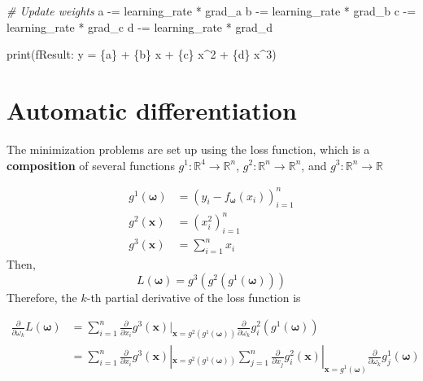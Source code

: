 \documentclass[
]{article}
\newenvironment{Shaded}{}{}
\newcommand{\BuiltInTok}[1]{\textcolor[rgb]{0.00,0.50,0.00}{#1}}
\newcommand{\CommentTok}[1]{\textcolor[rgb]{0.38,0.63,0.69}{\textit{#1}}}
\newcommand{\NormalTok}[1]{#1}
\newcommand{\OperatorTok}[1]{\textcolor[rgb]{0.40,0.40,0.40}{#1}}
\newcommand{\SpecialCharTok}[1]{\textcolor[rgb]{0.25,0.44,0.63}{#1}}
\newcommand{\SpecialStringTok}[1]{\textcolor[rgb]{0.73,0.40,0.53}{#1}}
\begin{document}
\begin{Shaded}
\begin{Highlighting}[]
    \CommentTok{\# Update weights}
\NormalTok{    a }\OperatorTok{{-}=}\NormalTok{ learning\_rate }\OperatorTok{*}\NormalTok{ grad\_a}
\NormalTok{    b }\OperatorTok{{-}=}\NormalTok{ learning\_rate }\OperatorTok{*}\NormalTok{ grad\_b}
\NormalTok{    c }\OperatorTok{{-}=}\NormalTok{ learning\_rate }\OperatorTok{*}\NormalTok{ grad\_c}
\NormalTok{    d }\OperatorTok{{-}=}\NormalTok{ learning\_rate }\OperatorTok{*}\NormalTok{ grad\_d}

\BuiltInTok{print}\NormalTok{(}\SpecialStringTok{f\textquotesingle{}Result: y = }\SpecialCharTok{\{}\NormalTok{a}\SpecialCharTok{\}}\SpecialStringTok{ + }\SpecialCharTok{\{}\NormalTok{b}\SpecialCharTok{\}}\SpecialStringTok{ x + }\SpecialCharTok{\{}\NormalTok{c}\SpecialCharTok{\}}\SpecialStringTok{ x\^{}2 + }\SpecialCharTok{\{}\NormalTok{d}\SpecialCharTok{\}}\SpecialStringTok{ x\^{}3\textquotesingle{}}\NormalTok{)}
\end{Highlighting}
\end{Shaded}

\hypertarget{automatic-differentiation}{%
\section{Automatic differentiation}\label{automatic-differentiation}}

The minimization problems are set up using the loss function, which is a
\textbf{composition} of several functions
\(g^1: \mathbb{R}^4 \to \mathbb{R}^n\),
\(g^2: \mathbb{R}^n \to \mathbb{R}^n\), and
\(g^3: \mathbb{R}^n \to \mathbb{R}\)

\begin{align*}
    g^1(\boldsymbol{\omega}) &= (y_i - f_{\boldsymbol{\omega}}(x_i))_{i=1}^n
\\
    g^2(\mathbf{x}) &= (x_i^2)_{i=1}^n
\\
    g^3(\mathbf{x}) &= \sum_{i=1}^{n} x_i
\end{align*} Then, \[
L(\boldsymbol{\omega}) = g^3(g^2(g^1(\boldsymbol{\omega})))
\] Therefore, the \(k\)-th partial derivative of the loss function is

\begin{align*}
\frac{\partial}{\partial \omega_k} L(\boldsymbol{\omega}) 
    & = \sum_{i=1}^{n} \frac{\partial }{\partial x_i} g^3(\mathbf{x})|_{\mathbf{x}= g^2(g^1(\boldsymbol{\omega}))} \frac{\partial}{\partial \omega_k}  g^2_i(g^1(\boldsymbol{\omega}))
\\
    & = \sum_{i=1}^{n} \frac{\partial }{\partial x_i} g^3(\mathbf{x})|_{\mathbf{x}= g^2(g^1(\boldsymbol{\omega}))} \sum_{j=1}^{n} \frac{\partial}{\partial x_j}  g^2_i(\mathbf{x})|_{\mathbf{x}= g^1(\boldsymbol{\omega})} \frac{\partial}{\partial \omega_k}  g^1_j(\boldsymbol{\omega})
\end{align*}
\end{document}
